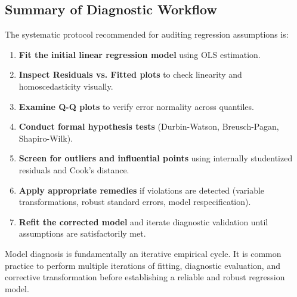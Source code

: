 \subsection{Summary of Diagnostic Workflow}

The systematic protocol recommended for auditing regression assumptions is:

\begin{enumerate}
	\item \textbf{Fit the initial linear regression model} using OLS estimation.
	\item \textbf{Inspect Residuals vs. Fitted plots} to check linearity and homoscedasticity visually.
	\item \textbf{Examine Q-Q plots} to verify error normality across quantiles.
	\item \textbf{Conduct formal hypothesis tests} (Durbin-Watson, Breusch-Pagan, Shapiro-Wilk).
	\item \textbf{Screen for outliers and influential points} using internally studentized residuals and Cook's distance.
	\item \textbf{Apply appropriate remedies} if violations are detected (variable transformations, robust standard errors, model respecification).
	\item \textbf{Refit the corrected model} and iterate diagnostic validation until assumptions are satisfactorily met.
\end{enumerate}

\begin{observacion}
	Model diagnosis is fundamentally an iterative empirical cycle. It is common practice to perform multiple iterations of fitting, diagnostic evaluation, and corrective transformation before establishing a reliable and robust regression model.
\end{observacion}
